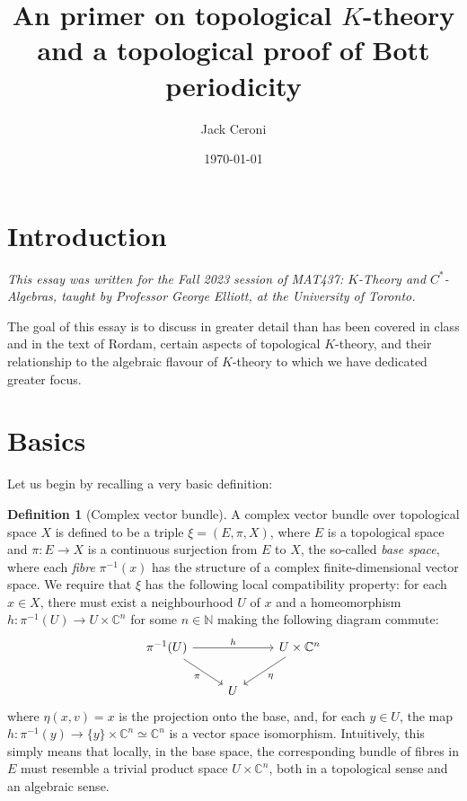 \documentclass[aps,pra,showpacs,notitlepage,onecolumn,superscriptaddress,nofootinbib]{revtex4-1}
\theoremstyle{definition}
\newtheorem{definition}{Definition}[section]
\begin{document}
\title{An primer on topological $K$-theory and a topological proof of Bott periodicity}
\author{Jack Ceroni}

\date{\today}

\maketitle

\section{Introduction}

\noindent \emph{This essay was written for the Fall 2023 session of MAT437: $K$-Theory and $C^{*}$-Algebras, taught by Professor George Elliott, at the University of Toronto.}
\newline

\noindent The goal of this essay is to discuss in greater detail than has been covered in class and in the text of Rordam, certain aspects of topological $K$-theory,
and their relationship to the algebraic flavour of $K$-theory to which we have dedicated greater focus.

\section{Basics}

\noindent Let us begin by recalling a very basic definition:

\begin{definition}[Complex vector bundle]
  A complex vector bundle over topological space $X$ is defined to be a triple $\xi = (E, \pi, X)$, where $E$ is a topological space and $\pi : E \rightarrow X$ is a continuous surjection
  from $E$ to $X$, the so-called \emph{base space}, where each \emph{fibre} $\pi^{-1}(x)$ has the structure of a complex finite-dimensional vector space. We require that $\xi$ has the following
  local compatibility property: for each $x \in X$, there must exist a neighbourhood $U$ of $x$ and a homeomorphism $h : \pi^{-1}(U) \rightarrow U \times \mathbb{C}^n$ for some $n \in \mathbb{N}$
  making the following diagram commute:
  \[\begin{tikzcd}
	          {\pi^{-1}(U)} && {U \times \mathbb{C}^{n}} \\
	          & U
	          \arrow["h", from=1-1, to=1-3]
	          \arrow["\pi"', from=1-1, to=2-2]
	          \arrow["\eta", from=1-3, to=2-2]
  \end{tikzcd}\]
  where $\eta(x, v) = x$ is the projection onto the base, and, for each $y \in U$, the map $h : \pi^{-1}(y) \rightarrow \{y\} \times \mathbb{C}^n \simeq \mathbb{C}^n$ is a vector
  space isomorphism. Intuitively, this simply means that locally, in the base space, the corresponding bundle of fibres in $E$ must resemble a trivial product space $U \times \mathbb{C}^n$,
  both in a topological sense and an algebraic sense.
\end{definition}
\end{document}
